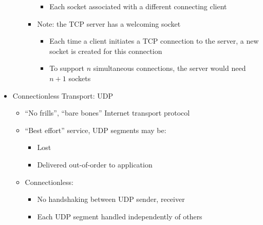 \begin{itemize}
\begin{itemize}
\begin{itemize}
\begin{itemize}
              \item Each socket associated with a different connecting client

            \end{itemize}

          \item Note: the TCP server has a welcoming socket

            \begin{itemize}

              \item Each time a client initiates a TCP connection to the server, a new socket is created for this connection

              \item To support $n$ simultaneous connections, the server would need $n+1$ sockets

            \end{itemize}

        \end{itemize}

    \end{itemize}

  \item Connectionless Transport: UDP

    \begin{itemize}

      \item ``No frills'', ``bare bones'' Internet transport protocol

      \item ``Best effort'' service, UDP segments may be:

        \begin{itemize}

          \item Lost

          \item Delivered out-of-order to application

        \end{itemize}

      \item Connectionless:

        \begin{itemize}

          \item No handshaking between UDP sender, receiver

          \item Each UDP segment handled independently of others


\end{itemize}
\end{itemize}
\end{itemize}
